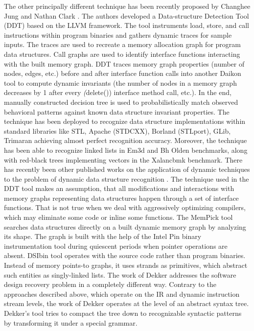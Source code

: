 \quad The other principally different technique has been recently proposed by Changhee Jung and Nathan Clark \cite{1669122}. The authors developed a Data-structure Detection Tool (DDT) based on the LLVM framework. The tool instruments load, store, and call instructions within program binaries and gathers dynamic traces for sample inputs. The traces are used to recreate a memory allocation graph for program data structures. Call graphs are used to identify interface functions interacting with the built memory graph. DDT traces memory graph properties (number of nodes, edges, etc.) before and after interface function calls into another Daikon tool to compute dynamic invariants (the number of nodes in a memory graph decreases by 1 after every \textit(delete()) interface method call, etc.). In the end, manually constructed decision tree is used to probabilistically match observed behavioral patterns against known data structure invariant properties. The technique has been deployed to recognize data structure implementations within standard libraries like STL, Apache (STDCXX), Borland (STLport), GLib, Trimaran achieving almost perfect recognition accuracy. Moreover, the technique has been able to recognize linked lists in Em3d and Bh Olden benchmarks, along with red-black trees implementing vectors in the Xalancbmk benchmark.\newline\null
\quad There has recently been other published works on the application of dynamic techniques to the problem of dynamic data structure recognition \cite{Rupprecht:2017:DID:3155562.3155607}\cite{Haller:2016:SDS:2938006.2938029}. The technique used in the DDT tool \cite{1669122} makes an assumption, that all modifications and interactions with memory graphs representing data structures happen through a set of interface functions. That is not true when we deal with aggressively optimizing compilers, which may eliminate some code or inline some functions. The MemPick tool \cite{Haller:2016:SDS:2938006.2938029} searches data structures directly on a built dynamic memory graph by analyzing its shape. The graph is built with the help of the Intel Pin binary instrumentation tool during quiescent periods when pointer operations are absent. DSIbin tool \cite{Rupprecht:2017:DID:3155562.3155607} operates with the source code rather than program binaries. Instead of memory points-to graphs, it uses strands as primitives, which abstract such entities as singly-linked lists.\newline\null
\quad The work of Dekker \cite{Dekker:1994:ADS:3107859.3107876} addresses the software design recovery problem in a completely different way. Contrary to the approaches described above, which operate on the IR and dynamic instruction stream levels, the work of Dekker operates at the level of an abstract syntax tree. Dekker's tool tries to compact the tree down to recognizable syntactic patterns by transforming it under a special grammar.
